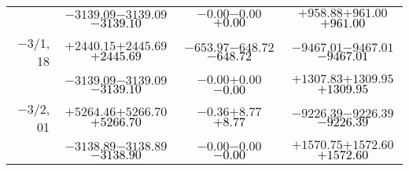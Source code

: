 \documentclass[compress]{beamer}
\begin{document}
\begin{frame}
{\begin{tabular}{r | c | c | c}
           & $-3139.09$\hspace{0.1 cm}$-3139.09$\hspace{0.1 cm}\textcolor{black}{$-3139.10$} & $-0.00$\hspace{0.1 cm}$-0.00$\hspace{0.1 cm}\textcolor{black}{$+0.00$} & $+958.88$\hspace{0.1 cm}$+961.00$\hspace{0.1 cm}\textcolor{black}{$+961.00$} \\
$-$3/1, 18 & $+2440.15$\hspace{0.1 cm}$+2445.69$\hspace{0.1 cm}\textcolor{black}{$+2445.69$} & $-653.97$\hspace{0.1 cm}$-648.72$\hspace{0.1 cm}\textcolor{black}{$-648.72$} & $-9467.01$\hspace{0.1 cm}$-9467.01$\hspace{0.1 cm}\textcolor{black}{$-9467.01$} \\
           & $-3139.09$\hspace{0.1 cm}$-3139.09$\hspace{0.1 cm}\textcolor{black}{$-3139.10$} & $-0.00$\hspace{0.1 cm}$+0.00$\hspace{0.1 cm}\textcolor{black}{$-0.00$} & $+1307.83$\hspace{0.1 cm}$+1309.95$\hspace{0.1 cm}\textcolor{black}{$+1309.95$} \\
$-$3/2, 01 & $+5264.46$\hspace{0.1 cm}$+5266.70$\hspace{0.1 cm}\textcolor{black}{$+5266.70$} & $-0.36$\hspace{0.1 cm}$+8.77$\hspace{0.1 cm}\textcolor{black}{$+8.77$} & $-9226.39$\hspace{0.1 cm}$-9226.39$\hspace{0.1 cm}\textcolor{black}{$-9226.39$} \\
           & $-3138.89$\hspace{0.1 cm}$-3138.89$\hspace{0.1 cm}\textcolor{black}{$-3138.90$} & $-0.00$\hspace{0.1 cm}$-0.00$\hspace{0.1 cm}\textcolor{black}{$-0.00$} & $+1570.75$\hspace{0.1 cm}$+1572.60$\hspace{0.1 cm}\textcolor{black}{$+1572.60$} \\

\end{tabular}}
\end{frame}
\end{document}
